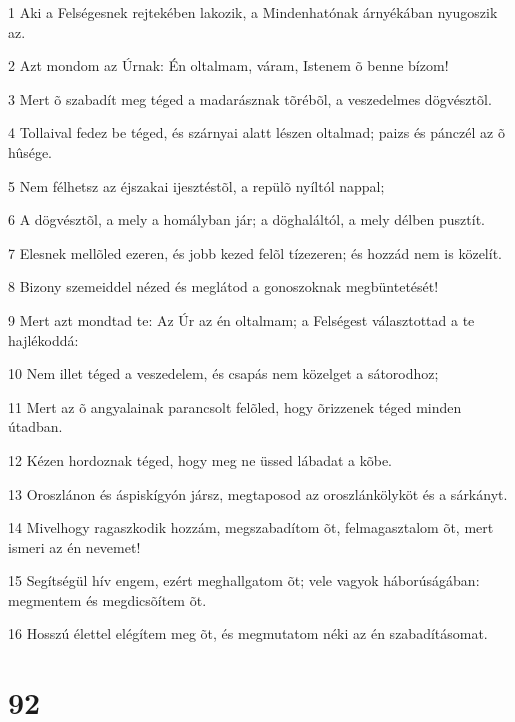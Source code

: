 \par 1 Aki a Felségesnek rejtekében lakozik, a Mindenhatónak árnyékában nyugoszik az.
\par 2 Azt mondom az Úrnak: Én oltalmam, váram, Istenem õ benne bízom!
\par 3 Mert õ szabadít meg téged a madarásznak tõrébõl, a veszedelmes dögvésztõl.
\par 4 Tollaival fedez be téged, és szárnyai alatt lészen oltalmad; paizs és pánczél az õ hûsége.
\par 5 Nem félhetsz az éjszakai ijesztéstõl, a repülõ nyíltól nappal;
\par 6 A dögvésztõl, a mely a homályban jár; a döghaláltól, a mely délben pusztít.
\par 7 Elesnek mellõled ezeren, és jobb kezed felõl tízezeren; és hozzád nem is közelít.
\par 8 Bizony szemeiddel nézed és meglátod a gonoszoknak megbüntetését!
\par 9 Mert azt mondtad te: Az Úr az én oltalmam; a Felségest választottad a te hajlékoddá:
\par 10 Nem illet téged a veszedelem, és csapás nem közelget a sátorodhoz;
\par 11 Mert az õ angyalainak parancsolt felõled, hogy õrizzenek téged minden útadban.
\par 12 Kézen hordoznak téged, hogy meg ne üssed lábadat a kõbe.
\par 13 Oroszlánon és áspiskígyón jársz, megtaposod az oroszlánkölyköt és a sárkányt.
\par 14 Mivelhogy ragaszkodik hozzám, megszabadítom õt, felmagasztalom õt, mert ismeri az én nevemet!
\par 15 Segítségül hív engem, ezért meghallgatom õt; vele vagyok háborúságában: megmentem és megdicsõítem õt.
\par 16 Hosszú élettel elégítem meg õt, és megmutatom néki az én szabadításomat.

\chapter{92}

